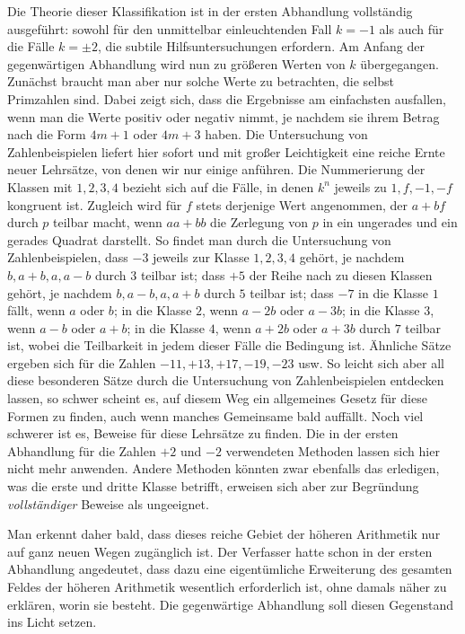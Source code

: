 Die Theorie dieser Klassifikation ist in der ersten Abhandlung vollständig ausgeführt: sowohl für den unmittelbar einleuchtenden Fall $k=-1$ als auch für die Fälle $k=\pm2$, die subtile Hilfsuntersuchungen erfordern. Am Anfang der gegenwärtigen Abhandlung wird nun zu größeren Werten von $k$ übergegangen. Zunächst braucht man aber nur solche Werte zu betrachten, die selbst Primzahlen sind. Dabei zeigt sich, dass die Ergebnisse am einfachsten ausfallen, wenn man die Werte positiv oder negativ nimmt, je nachdem sie ihrem Betrag nach die Form $4m+1$ oder $4m+3$ haben. Die Untersuchung von Zahlenbeispielen liefert hier sofort und mit großer Leichtigkeit eine reiche Ernte neuer Lehrsätze, von denen wir nur einige anführen. Die Nummerierung der Klassen mit $1,2,3,4$ bezieht sich auf die Fälle, in denen $k^n$ jeweils zu $1,f,-1,-f$ kongruent ist. Zugleich wird für $f$ stets derjenige Wert angenommen, der $a+bf$ durch $p$ teilbar macht, wenn $aa+bb$ die Zerlegung von $p$ in ein ungerades und ein gerades Quadrat darstellt. So findet man durch die Untersuchung von Zahlenbeispielen, dass $-3$ jeweils zur Klasse $1,2,3,4$ gehört, je nachdem $b,a+b,a,a-b$ durch $3$ teilbar ist; dass $+5$ der Reihe nach zu diesen Klassen gehört, je nachdem $b,a-b,a,a+b$ durch $5$ teilbar ist; dass $-7$ in die Klasse $1$ fällt, wenn $a$ oder $b$; in die Klasse $2$, wenn $a-2b$ oder $a-3b$; in die Klasse $3$, wenn $a-b$ oder $a+b$; in die Klasse $4$, wenn $a+2b$ oder $a+3b$ durch $7$ teilbar ist, wobei die Teilbarkeit in jedem dieser Fälle die Bedingung ist. Ähnliche Sätze ergeben sich für die Zahlen $-11,+13,+17,-19,-23$ usw. So leicht sich aber all diese besonderen Sätze durch die Untersuchung von Zahlenbeispielen entdecken lassen, so schwer scheint
es, auf diesem Weg ein allgemeines Gesetz für diese Formen zu finden, auch wenn manches Gemeinsame bald auffällt. Noch viel schwerer ist es, Beweise für diese Lehrsätze zu finden. Die in der ersten Abhandlung für die Zahlen $+2$ und $-2$ verwendeten Methoden lassen sich hier nicht mehr anwenden. Andere Methoden könnten zwar ebenfalls das erledigen, was die erste und dritte Klasse betrifft, erweisen sich aber zur Begründung \emph{vollständiger} Beweise als ungeeignet.

Man erkennt daher bald, dass dieses reiche Gebiet der höheren Arithmetik nur auf ganz neuen Wegen zugänglich ist. Der Verfasser hatte schon in der ersten Abhandlung angedeutet, dass dazu eine eigentümliche Erweiterung des gesamten Feldes der höheren Arithmetik wesentlich erforderlich ist, ohne damals näher zu erklären, worin sie besteht. Die gegenwärtige Abhandlung soll diesen Gegenstand ins Licht setzen.

